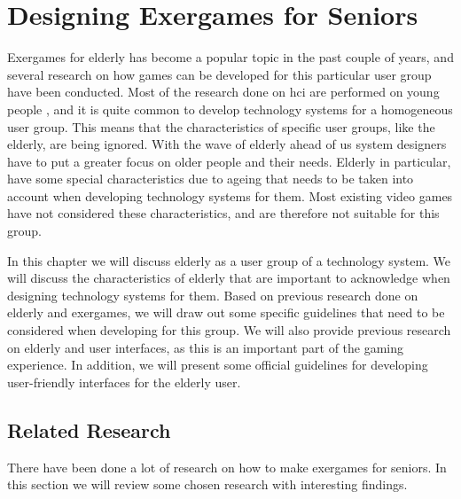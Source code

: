 \chapter{Designing Exergames for Seniors}
\label{chap:exforseniors}

Exergames for elderly has become a popular topic in the past couple of years, and several research on how games can be developed for this particular user group have been conducted. Most of the research done on \ac{hci} are performed on young people \cite{dickinson2007methods}, and it is quite common to develop technology systems for a homogeneous user group. This means that the characteristics of specific user groups, like the elderly, are being ignored. With the wave of elderly ahead of us system designers have to put a greater focus on older people and their needs. Elderly in particular, have some special characteristics due to ageing that needs to be taken into account when developing technology systems for them. Most existing video games have not considered these characteristics, and are therefore not suitable for this group. 

In this chapter we will discuss elderly as a user group of a technology system. We will discuss the characteristics of elderly that are important to acknowledge when designing technology systems for them. Based on previous research done on elderly and exergames, we will draw out some specific guidelines that need to be considered when developing for this group. We will also provide previous research on elderly and user interfaces, as this is an important part of the gaming experience.  In addition, we will present some official guidelines for developing user-friendly interfaces for the elderly user. 

\section{Related Research}
\label{sec:relatedresearch}
There have been done a lot of research on how to make exergames for seniors. In this section we will review some chosen research with interesting findings.

